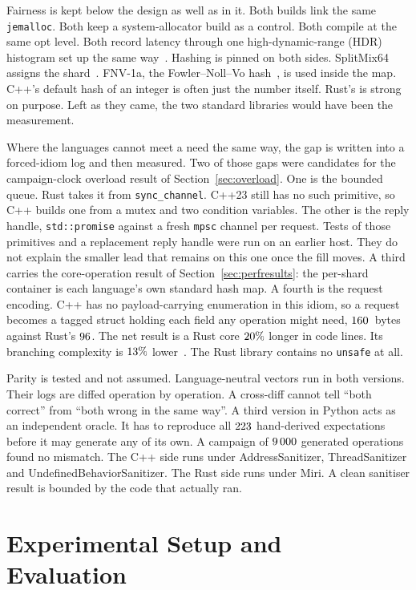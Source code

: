 \documentclass[english,oneside,a4paper,censored,csm,software-track-2020]{HYthesisML}
\begin{document}
Fairness is kept below the design as well as in it. Both builds link the same
\texttt{jemalloc}. Both keep a system-allocator build as a control. Both
compile at the same opt level. Both record latency through one high-dynamic-range
(HDR) histogram set up the same way~\cite{tene_hdrhistogram}. Hashing is pinned
on both sides. SplitMix64 assigns the shard~\cite{steele2014splitmix}. FNV-1a, the
Fowler--Noll--Vo hash~\cite{rfc9923}, is used inside the map. C++'s default hash of an
integer is often just the number itself. Rust's is strong on purpose. Left as they came,
the two standard libraries would have been the measurement.

Where the languages cannot meet a need the same way, the gap is written into a
forced-idiom log and then measured. Two of those gaps were candidates for the
campaign-clock overload result of Section~\ref{sec:overload}. One is the bounded queue. Rust takes it
from \texttt{sync\_channel}. C++23 still has no such primitive, so C++ builds
one from a mutex and two condition variables. The other is the reply handle,
\texttt{std::promise} against a fresh \texttt{mpsc} channel per request. Tests
of those primitives and a replacement reply handle were run on an earlier
host. They do not explain the smaller lead that remains on this one once the
fill moves. A
third carries the core-operation result of Section~\ref{sec:perfresults}: the
per-shard container is each language's own standard hash map. A fourth is the
request encoding. C++ has no payload-carrying enumeration in this idiom, so a
request becomes a tagged struct holding each field any operation might need,
$160$~bytes against Rust's $96$. The net result is
a Rust core $20\%$ longer in code lines. Its branching complexity is
$13\%$ lower~\cite{lizard}. The Rust library contains no
\texttt{unsafe} at all.

Parity is tested and not assumed. Language-neutral vectors run in both
versions. Their logs are diffed operation by operation. A cross-diff cannot tell ``both
correct'' from ``both wrong in the same way''. A third version in Python acts
as an independent oracle. It has to reproduce all $223$ hand-derived
expectations before it may generate any of its own. A campaign of
$9\,000$ generated operations found no mismatch. The C++ side runs under
AddressSanitizer, ThreadSanitizer and UndefinedBehaviorSanitizer. The Rust
side runs under Miri. A clean sanitiser result is bounded by the code that
actually ran.

\chapter{Experimental Setup and Evaluation\label{chapter:eval}}
\end{document}
